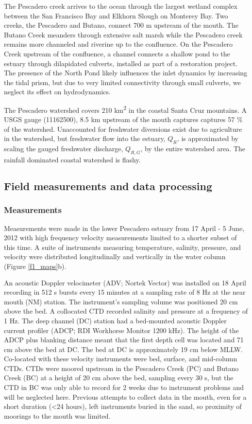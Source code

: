 The Pescadero creek arrives to the ocean through the largest wetland
complex between the San Francisco Bay and Elkhorn Slough on Monterey
Bay. Two creeks, the Pescadero and Butano, connect 700 m upstream
of the mouth. The Butano Creek meanders through extensive salt marsh
while the Pescadero creek remains more channeled and riverine up to
the confluence. On the Pescadero Creek upstream of the confluence,
a channel connects a shallow pond to the estuary through dilapidated
culverts\emph{, }installed as part of a restoration project. The presence
of the North Pond likely influences the inlet dynamics by increasing
the tidal prism, but due to very limited connectivity through small
culverts, we neglect its effect on hydrodynamics.

The Pescadero watershed covers 210 km\textsuperscript{2} in the coastal
Santa Cruz mountains. A USGS gauge (11162500), 8.5 km upstream of
the mouth captures captures 57 \% of the watershed. Unaccounted for
freshwater diversions exist due to agriculture in the watershed, but
freshwater flow into the estuary, \emph{$Q_{R}$, }is approximated
by scaling the gauged freshwater discharge, $Q_{R,G}$, by the entire
watershed area. The rainfall dominated coastal watershed is flashy.


\subsection{Field measurements and data processing}


\subsubsection{Measurements}

Measurements were made in the lower Pescadero estuary from 17 April
- 5 June, 2012 with high frequency velocity measurements limited to
a shorter subset of this time. A suite of instruments measuring temperature,
salinity, pressure, and velocity were distributed longitudinally and
vertically in the water column (Figure \ref{f1_maps}b).

An acoustic Doppler velocimeter (ADV; Nortek Vector) was installed
on 18 April recording in 512 s bursts every 15 minutes at a sampling
rate of 8 Hz at the near mouth (NM) station. The instrument's sampling
volume was positioned 20 cm above the bed. A collocated CTD recorded
salinity and pressure at a frequency of 1 Hz. The deep channel (DC)
station had a bed-mounted acoustic Doppler current profiler (ADCP;
RDI Workhorse Monitor 1200 kHz). The height of the ADCP plus blanking
distance meant that the first depth cell was located and 71 cm above
the bed at DC. The bed at DC is approximately 19 cm below MLLW. Co-located
with these velocity instruments were bed, surface, and mid-column
CTDs. CTDs were moored upstream in the Pescadero Creek (PC) and Butano
Creek (BC) at a height of 20 cm above the bed, sampling every 30 s,
but the CTD in BC was only able to record for 2 weeks due to instrument
problems and will be neglected here. Previous attempts to collect
data in the mouth, even for a short duration (<24 hours), left instruments
buried in the sand, so proximity of moorings to the mouth was limited. 

